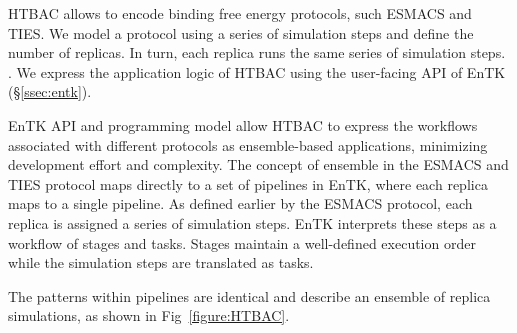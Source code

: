 HTBAC %
allows to %
encode binding free energy protocols, such ESMACS and TIES\@. We model a
protocol using a series of simulation steps and define the number of 
replicas. In turn, each replica runs the same series of simulation steps.
 . We express the application logic of HTBAC using
the user-facing API %
of EnTK (\S\ref{ssec:entk}). 

EnTK %
API and programming model allow HTBAC to express the workflows associated
with different protocols as ensemble-based applications,
minimizing development effort and complexity. 
The concept of %
ensemble in the ESMACS and TIES  protocol maps directly to a set of pipelines in EnTK, where each 
replica maps to a single pipeline. As defined earlier by the ESMACS protocol,
each replica is assigned a series of simulation steps. EnTK interprets these steps 
as a workflow of stages and tasks. Stages maintain a well-defined execution 
order while the simulation steps are translated as tasks. 


The patterns within pipelines are identical and describe an ensemble of replica
simulations, as shown in Fig~\ref{figure:HTBAC}. 

